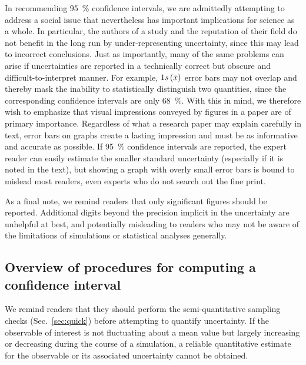 In recommending 95~\% confidence intervals, we are admittedly attempting to address a social issue that nevertheless has important implications for science as a whole. In particular, the authors of a study and the reputation of their field do not benefit in the long run by under-representing uncertainty, since this may lead to incorrect conclusions. Just as importantly, many of the same problems can arise if uncertainties are reported in a technically correct but obscure and difficult-to-interpret manner. For example, $1s\left( \bar{x} \right)$ error bars may not overlap and thereby mask the inability to statistically distinguish two quantities, since the corresponding confidence intervals are only 68~\%. With this in mind, we therefore wish to emphasize that visual impressions conveyed by figures in a paper are of primary importance. Regardless of what a research paper may explain carefully in text, error bars on graphs create a lasting impression and must be as informative and accurate as possible. If 95~\% confidence intervals are reported, the expert reader can easily estimate the smaller standard uncertainty (especially if it is noted in the text), but showing a graph with overly small error bars is bound to mislead most readers, even experts who do not search out the fine print.

As a final note, we remind readers that only significant figures should be reported.
Additional digits beyond the precision implicit in the uncertainty are unhelpful at best, and potentially misleading to readers who may not be aware of the limitations of simulations or statistical analyses generally.


\subsection{Overview of procedures for computing a confidence interval}
We remind readers that they should perform the semi-quantitative sampling checks (Sec.\ \ref{sec:quick}) before attempting to quantify uncertainty.  If the observable of interest is not fluctuating about a mean value but largely increasing or decreasing during the course of a simulation, a reliable quantitative estimate for the observable or its associated uncertainty cannot be obtained.

